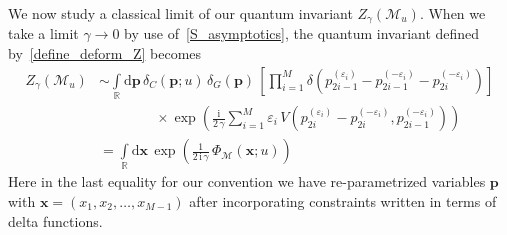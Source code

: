 \documentclass[12pt,reqno]{amsart}
\numberwithin{equation}{section}
\newcommand{\I}{\mathrm{i}}
\newcommand{\E}{\mathrm{e}}
\begin{document}




We now study a classical limit of our quantum invariant
$Z_\gamma(\mathcal{M}_u)$.
When we take a  limit $\gamma \to 0$
by use of~\eqref{S_asymptotics},
the quantum invariant defined by~\eqref{define_deform_Z} becomes
\begin{align}
  Z_\gamma \left( \mathcal{M}_u \right)
  &\sim
  \int\limits_{\mathbb{R}} \mathrm{d} \boldsymbol{p} \,
  \delta_C(\boldsymbol{p}; u) \,
  \delta_G(\boldsymbol{p}) \,
  \left[
    \prod_{i=1}^M
    \delta \left(
      p_{2i-1}^{( \varepsilon_i)} - p_{2i-1}^{( - \varepsilon_i)}
      -p_{2i}^{( - \varepsilon_i)}
    \right)
  \right]
  \nonumber \\
  & \qquad \qquad 
  \times
  \exp
  \left(
    \frac{\I}{2 \, \gamma} 
    \sum_{i=1}^M
    \varepsilon_i \,
    V \left(
      p_{2i}^{(\varepsilon_i)} - p_{2i}^{( - \varepsilon_i)} ,
      p_{2i-1}^{( - \varepsilon_i)}
    \right)
  \right)
  \nonumber
  \\
  & =
  \int\limits_{\mathbb{R}} \mathrm{d} \boldsymbol{x}  \,
  \exp
  \left(
    \frac{1}{2 \, \I \, \gamma} \,
    \Phi_{\mathcal{M}}(\boldsymbol{x}; u )
  \right)
  \label{classical_partition_function}
\end{align}
Here in the last equality for our convention
we have re-parametrized variables
$\boldsymbol{p}$
with
$\boldsymbol{x}
=
\left(
  x_1, x_2, \dots, x_{M-1}
\right)$  after incorporating constraints written in
terms of delta functions.
\end{document}
